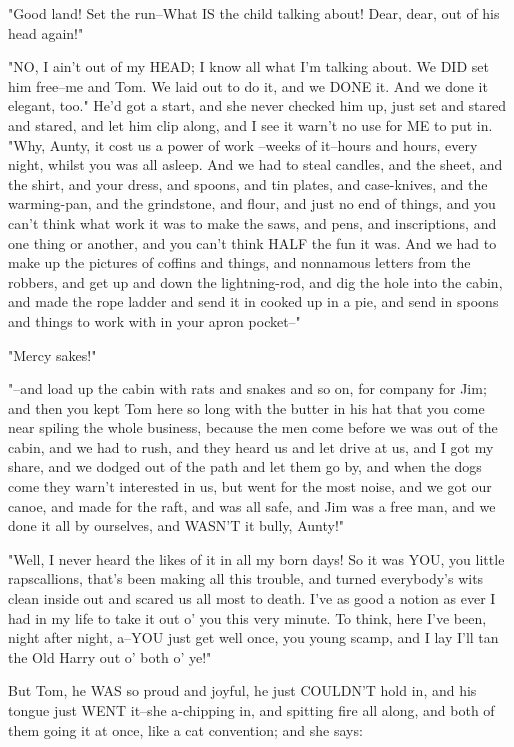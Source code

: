 "Good land!  Set the run--What IS the child talking about!  Dear, dear,
out of his head again!"

"NO, I ain't out of my HEAD; I know all what I'm talking about.  We DID
set him free--me and Tom.  We laid out to do it, and we DONE it.  And we
done it elegant, too."  He'd got a start, and she never checked him up,
just set and stared and stared, and let him clip along, and I see it
warn't no use for ME to put in.  "Why, Aunty, it cost us a power of work
--weeks of it--hours and hours, every night, whilst you was all asleep.
And we had to steal candles, and the sheet, and the shirt, and your
dress, and spoons, and tin plates, and case-knives, and the warming-pan,
and the grindstone, and flour, and just no end of things, and you can't
think what work it was to make the saws, and pens, and inscriptions, and
one thing or another, and you can't think HALF the fun it was.  And we
had to make up the pictures of coffins and things, and nonnamous letters
from the robbers, and get up and down the lightning-rod, and dig the hole
into the cabin, and made the rope ladder and send it in cooked up in a
pie, and send in spoons and things to work with in your apron pocket--"

"Mercy sakes!"

"--and load up the cabin with rats and snakes and so on, for company for
Jim; and then you kept Tom here so long with the butter in his hat that
you come near spiling the whole business, because the men come before we
was out of the cabin, and we had to rush, and they heard us and let drive
at us, and I got my share, and we dodged out of the path and let them go
by, and when the dogs come they warn't interested in us, but went for the
most noise, and we got our canoe, and made for the raft, and was all
safe, and Jim was a free man, and we done it all by ourselves, and WASN'T
it bully, Aunty!"

"Well, I never heard the likes of it in all my born days!  So it was YOU,
you little rapscallions, that's been making all this trouble, and turned
everybody's wits clean inside out and scared us all most to death.  I've
as good a notion as ever I had in my life to take it out o' you this very
minute.  To think, here I've been, night after night, a--YOU just get
well once, you young scamp, and I lay I'll tan the Old Harry out o' both
o' ye!"

But Tom, he WAS so proud and joyful, he just COULDN'T hold in, and his
tongue just WENT it--she a-chipping in, and spitting fire all along, and
both of them going it at once, like a cat convention; and she says:

